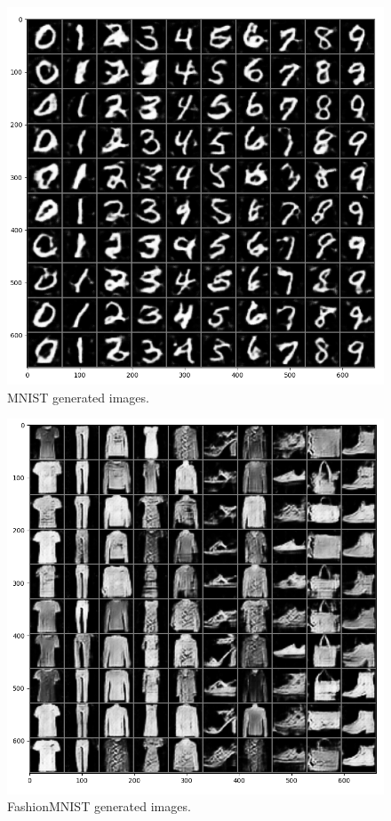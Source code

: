 \documentclass[10pt,twocolumn,letterpaper]{article}
\begin{document}
\begin{figure}[h!t]
   \centering
   \includegraphics[scale=0.4]{images/mnist.png}
   \caption{MNIST generated images.}
   \label{fig:mnist}
\end{figure}

\begin{figure}[h!t]
   \centering
   \includegraphics[scale=0.4]{images/fashion.png}
   \caption{FashionMNIST generated images.}
   \label{fig:fashion}
\end{figure}
\end{document}
